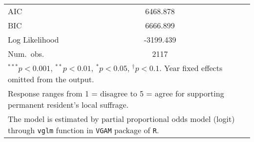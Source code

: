 \begin{table}
\begin{center}
\begin{tabular}{l c c c c }
\midrule
AIC                    & 6468.878          &                   &                   &                \\
BIC                    & 6666.899          &                   &                   &                \\
Log Likelihood         & -3199.439         &                   &                   &                \\
Num.\ obs.             & 2117              &                   &                   &                \\
\bottomrule
\multicolumn{5}{l}{\scriptsize{$^{***}p<0.001$, $^{**}p<0.01$, $^*p<0.05$, $^{\dagger}p<0.1$. Year fixed effects omitted from the output.}} \\ \multicolumn{5}{l}{\scriptsize{Response ranges from 1 = disagree to 5 = agree for supporting permanent resident's local suffrage.}} \\ \multicolumn{5}{l}{\scriptsize{The model is estimated by partial proportional odds model (logit) through \texttt{vglm} function in \texttt{VGAM} package of \texttt{R}.}}
\end{tabular}
\label{goltab_umom}
\end{center}
\end{table}

